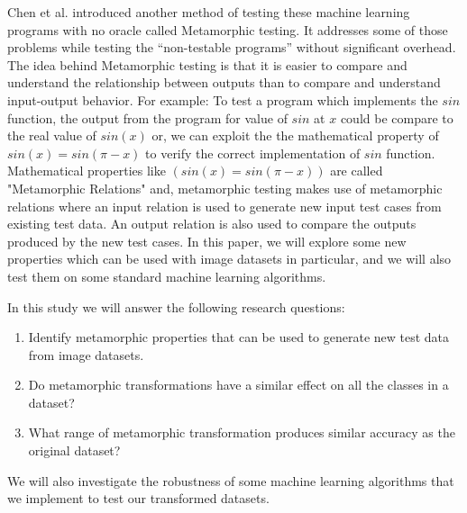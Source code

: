 Chen et al. introduced another method of testing these machine learning programs with no oracle called Metamorphic testing. It addresses some of those problems while testing the \enquote{non-testable programs} without significant overhead. The idea behind Metamorphic testing is that it is easier to compare and understand the relationship between outputs than to compare and understand input-output behavior. For example: To test a program which implements the $sin$ function, the output from the program for value of $sin$ at $x$ could be compare to the real value of $sin(x)$ or, we can exploit the the mathematical property of $sin(x) = sin(\pi-x)$ to verify the correct implementation of $sin$ function. Mathematical properties like $(sin(x) = sin(\pi-x))$ are called "Metamorphic Relations" and, metamorphic testing makes use of metamorphic relations where an input relation is used to generate new input test cases from existing test data. An output relation is also used to compare the outputs produced by the new test cases.
\newline
In this paper, we will explore some new properties which can be used with image datasets in particular, and we will also test them on some standard machine learning algorithms.


In this study we will answer the following research questions:
\begin{enumerate}
    \item Identify metamorphic properties that can be used to generate new test data from image datasets.
    \item Do metamorphic transformations have a similar effect on all the classes in a dataset?
    \item What range of metamorphic transformation produces similar accuracy as the original dataset?

\end{enumerate}
We will also investigate the robustness of some machine learning algorithms that we implement to test our transformed datasets.
%
